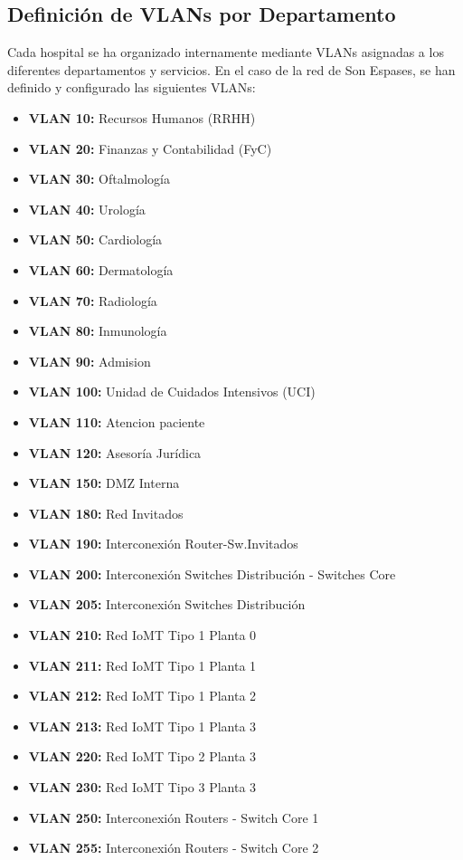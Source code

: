 \subsection{Definición de VLANs por Departamento}
\label{subsec:VLANs}
Cada hospital se ha organizado internamente mediante VLANs asignadas a los diferentes departamentos y servicios. En el caso de la red de Son Espases, se han definido y configurado 
las siguientes VLANs: 
\begin{itemize}
    \item \textbf{VLAN 10:} Recursos Humanos (RRHH)
    \item \textbf{VLAN 20:} Finanzas y Contabilidad (FyC)
    \item \textbf{VLAN 30:} Oftalmología
    \item \textbf{VLAN 40:} Urología 
    \item \textbf{VLAN 50:} Cardiología
    \item \textbf{VLAN 60:} Dermatología 
    \item \textbf{VLAN 70:} Radiología 
    \item \textbf{VLAN 80:} Inmunología 
    \item \textbf{VLAN 90:} Admision
    \item \textbf{VLAN 100:} Unidad de Cuidados Intensivos (UCI)
    \item \textbf{VLAN 110:} Atencion paciente 
    \item \textbf{VLAN 120:} Asesoría Jurídica
    \item \textbf{VLAN 150:} DMZ Interna
    \item \textbf{VLAN 180:} Red Invitados
    \item \textbf{VLAN 190:} Interconexión Router-Sw.Invitados
    \item \textbf{VLAN 200:} Interconexión Switches Distribución - Switches Core
    \item \textbf{VLAN 205:} Interconexión Switches Distribución
    \item \textbf{VLAN 210:} Red IoMT Tipo 1 Planta 0
    \item \textbf{VLAN 211:} Red IoMT Tipo 1 Planta 1
    \item \textbf{VLAN 212:} Red IoMT Tipo 1 Planta 2
    \item \textbf{VLAN 213:} Red IoMT Tipo 1 Planta 3
    \item \textbf{VLAN 220:} Red IoMT Tipo 2 Planta 3
    \item \textbf{VLAN 230:} Red IoMT Tipo 3 Planta 3
    \item \textbf{VLAN 250:} Interconexión Routers - Switch Core 1
    \item \textbf{VLAN 255:} Interconexión Routers - Switch Core 2
\end{itemize}

